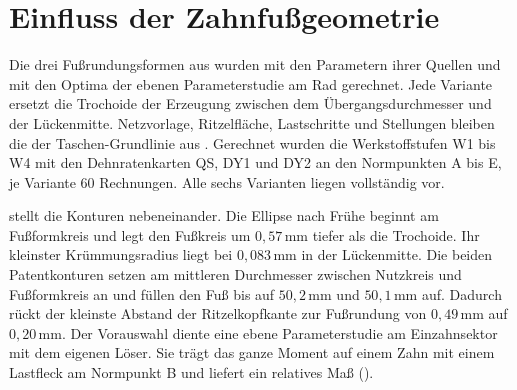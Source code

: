 \section{Einfluss der Zahnfußgeometrie}
\label{sec:fussgeometrie}

Die drei Fußrundungsformen aus  wurden mit den Parametern ihrer Quellen und mit den Optima der ebenen Parameterstudie am Rad gerechnet. Jede Variante ersetzt die Trochoide der Erzeugung zwischen dem Übergangsdurchmesser und der Lückenmitte. Netzvorlage, Ritzelfläche, Lastschritte und Stellungen bleiben die der Taschen-Grundlinie aus . Gerechnet wurden die Werkstoffstufen W1 bis W4 mit den Dehnratenkarten QS, DY1 und DY2 an den Normpunkten A bis E, je Variante 60 Rechnungen. Alle sechs Varianten liegen vollständig vor.

 stellt die Konturen nebeneinander. Die Ellipse nach Frühe \cite{Frue12} beginnt am Fußformkreis und legt den Fußkreis um $0{,}57$\,mm tiefer als die Trochoide. Ihr kleinster Krümmungsradius liegt bei $0{,}083$\,mm in der Lückenmitte. Die beiden Patentkonturen setzen am mittleren Durchmesser zwischen Nutzkreis und Fußformkreis an und füllen den Fuß bis auf $50{,}2$\,mm und $50{,}1$\,mm auf. Dadurch rückt der kleinste Abstand der Ritzelkopfkante zur Fußrundung von $0{,}49$\,mm auf $0{,}20$\,mm. Der Vorauswahl diente eine ebene Parameterstudie am Einzahnsektor mit dem eigenen Löser. Sie trägt das ganze Moment auf einem Zahn mit einem Lastfleck am Normpunkt B und liefert ein relatives Maß ().


